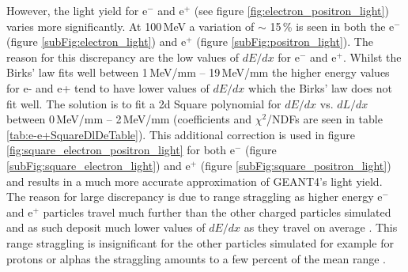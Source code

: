 However, the light yield for e$^-$ and e$^+$ (see figure \ref{fig:electron_positron_light}) varies more significantly. At 100\,MeV a variation of $\sim$ 15\,\% is seen in both the e$^-$ (figure \ref{subFig:electron_light}) and e$^+$ (figure \ref{subFig:positron_light}). The reason for this discrepancy are the low values of $dE/dx$ for e$^-$ and e$^+$. Whilst the Birks' law fits well between 1\,MeV/mm -- 19\,MeV/mm the higher energy values for e- and e+ tend to have lower values of $dE/dx$ which the Birks' law does not fit well. The solution is to fit a 2d Square polynomial for $dE/dx$ vs. $dL/dx$ between 0\,MeV/mm -- 2\,MeV/mm (coefficients and $\chi^2$/NDFs are seen in table \ref{tab:e-e+SquareDlDeTable}). This additional correction is used in figure \ref{fig:square_electron_positron_light} for both e$^-$ (figure \ref{subFig:square_electron_light}) and e$^+$ (figure \ref{subFig:square_positron_light}) and results in a much more accurate approximation of GEANT4's light yield. The reason for large discrepancy is due to range straggling as higher energy e$^-$ and e$^+$ particles travel much further than the other charged particles simulated and as such deposit much lower values of $dE/dx$ as they travel on average \cite{knoll_2010}. This range straggling is insignificant for the other particles simulated for example for protons or alphas the straggling amounts to a few percent of the mean range \cite{knoll_2010}. 

